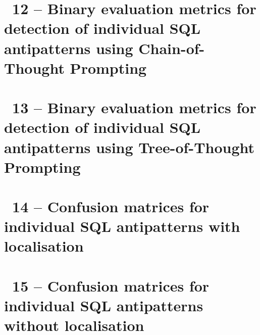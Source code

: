 \clearpage
{}
\makeatletter
\def\@currentlabel{12}
\makeatother
{}\label{chapter:appendix-chain-of-thought-accuracy}
\chapter*{\appendixTitle~12 -- Binary evaluation metrics for detection of individual SQL antipatterns using Chain-of-Thought Prompting}


\clearpage
{}
\makeatletter
\def\@currentlabel{13}
\makeatother
{}\label{chapter:appendix-tree-of-thought-accuracy}
\chapter*{\appendixTitle~13 -- Binary evaluation metrics for detection of individual SQL antipatterns using Tree-of-Thought Prompting}


\clearpage
{}
\makeatletter
\def\@currentlabel{14}
\makeatother
{}\label{chapter:appendix-localisation-confusion-matrices}
\chapter*{\appendixTitle~14 -- Confusion matrices for individual SQL antipatterns with localisation}


\clearpage
{}
\makeatletter
\def\@currentlabel{15}
\makeatother
{}\label{chapter:appendix-classification-confusion-matrices}
\chapter*{\appendixTitle~15 -- Confusion matrices for individual SQL antipatterns without localisation}


\clearpage
{}
\makeatletter
\def\@currentlabel{16}
\makeatother
{}\label{chapter:appendix-jaccard-project}
